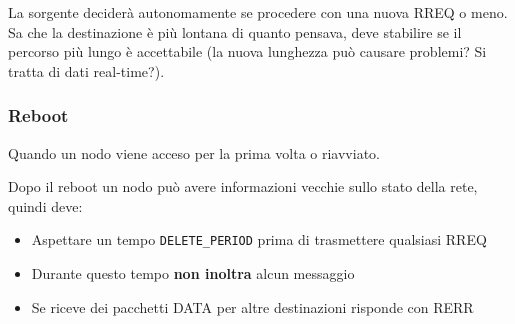La sorgente deciderà autonomamente se procedere con una nuova RREQ o meno. Sa che la destinazione è più lontana di quanto pensava, deve stabilire se il percorso più lungo è accettabile (la nuova lunghezza può causare problemi? Si tratta di dati real-time?).

\subsubsection{Reboot}

Quando un nodo viene acceso per la prima volta o riavviato. 

Dopo il reboot un nodo può avere informazioni vecchie sullo stato della rete, quindi deve: 
\begin{itemize}
	\item Aspettare un tempo \texttt{DELETE\_PERIOD} prima di trasmettere qualsiasi RREQ

	\item Durante questo tempo \textbf{non inoltra} alcun messaggio

	\item Se riceve dei pacchetti DATA per altre destinazioni risponde con RERR
\end{itemize}
